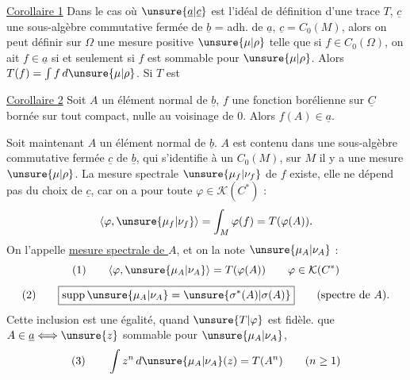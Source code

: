 \uline{Corollaire 1} Dans le cas où $\unsure{\underline a|\underline c}$ est l'idéal de définition d'une trace  $T$, $\underline c$ une sous-algèbre commutative  fermée de $\underline b$ = adh. de $\underline a$, $\underline c=C_0(M)$, alors on peut définir sur $\Omega$ une mesure positive $\unsure{\mu|\rho}$ telle que si $f\in C_0(\Omega)$, on ait $f\in\underline a$ si et seulement si $f$ est sommable pour $\unsure{\mu|\rho}$. Alors $T(f)=\int f\,d\unsure{\mu|\rho}$. Si $T$ est 

\uline{Corollaire 2} Soit $A$ un élément normal de $\underline b$, $f$ une fonction borélienne sur $\underline C$ bornée sur tout compact, nulle au voisinage de $0$. Alors $f(A)\in\underline a$.

Soit maintenant $A$ un élément normal de $\underline b$. $A$ est contenu dans une sous-algèbre  commutative  fermée $\underline c$ de $\underline b$, qui s'identifie à un $C_0(M)$, sur $M$ il y a une mesure $\unsure{\mu|\rho}$.  La mesure spectrale $\unsure{\mu_f|\nu_f}$ de $f$ existe, elle ne dépend pas du choix de $\underline c$, car on a pour toute $\varphi\in\mathcal K(C^*)$ :
\[
\langle\varphi,\unsure{\mu_f|\nu_f}\rangle=\int_M\varphi(f)=T(\varphi(A)).
\]
On l'appelle \uline{mesure spectrale de $A$}, et on la note $\unsure{\mu_A|\nu_A}$ :
\[
(1)\qquad\langle\varphi,\unsure{\mu_A|\nu_A}\rangle=T(\varphi(A))\qquad\varphi\in\mathcal K(C^*)
\]
\[
(2)\qquad\boxed{\mathop{\rm supp}\unsure{\mu_A|\nu_A}=\unsure{\sigma^*(A)|\sigma(A)}}\qquad\text{(spectre de $A$).}
\]
Cette inclusion est une égalité, quand $\unsure{T|\varphi}$ est fidèle.  que $A\in\underline a\Longleftrightarrow\unsure{z}$ sommable pour $\unsure{\mu_A|\nu_A}$, 
\[
(3)\qquad\int z^n\,d\unsure{\mu_A|\nu_A}(z)=T(A^n)\qquad(n\geq1)
\]

